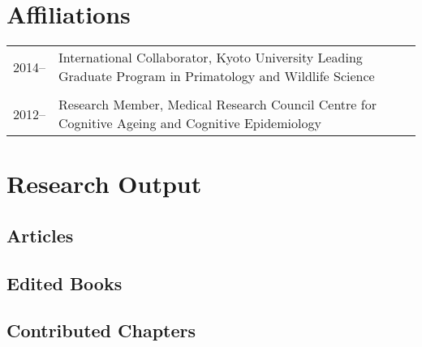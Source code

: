 \documentclass[11pt]{article}
\begin{document}
\section*{Affiliations}

\begin{tabular}{p{3cm}p{12cm}}
2014-- & International Collaborator, Kyoto University Leading Graduate Program in
Primatology and Wildlife Science \\ \\

2012-- & Research Member, Medical Research Council Centre for
Cognitive Ageing and Cognitive Epidemiology
\end{tabular}

\newpage

\section*{Research Output}
\subsection*{Articles}

\nocite{*}

\setlength\bibhang{0pt}

\printbibliography[type=article,notkeyword=reviewrevision,heading=none]

\subsection*{Edited Books}

\printbibliography[type=book,notkeyword=reviewrevision,heading=none]

\subsection*{Contributed Chapters}

\printbibliography[type=inbook,notkeyword=reviewrevision,heading=none]



\end{document}
